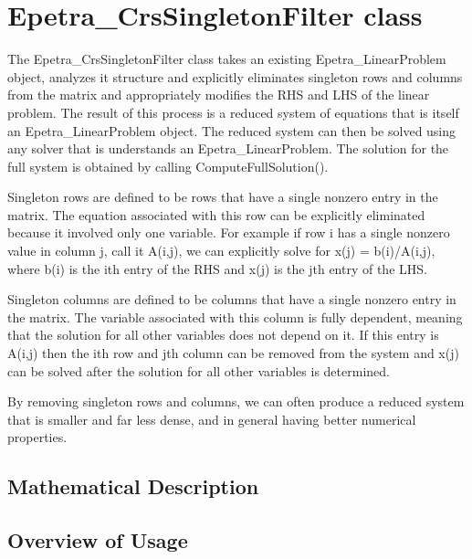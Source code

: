 \section{Epetra\_CrsSingletonFilter class}
 The Epetra\_CrsSingletonFilter class takes an existing Epetra\_LinearProblem object,
analyzes it structure and explicitly eliminates singleton rows and columns from the matrix and
appropriately modifies the RHS and LHS of the linear problem.  The result of this process is a
reduced system of equations that is itself an Epetra\_LinearProblem object.  The reduced system
can then be solved using any solver that is understands an Epetra\_LinearProblem.  The 
solution for the full system is obtained by calling ComputeFullSolution().
    
Singleton rows are defined to be rows that have a single nonzero entry in the matrix.
The equation associated with this row can be explicitly eliminated because it involved
 only one variable.  For example if row i has a single nonzero value in column j, call 
it A(i,j), we can explicitly solve for x(j) = b(i)/A(i,j), where b(i) is the ith entry 
of the RHS and x(j) is the jth entry of the LHS.

Singleton columns are defined to be columns that have a single nonzero entry in the matrix.  The variable associated with this column is fully dependent, meaning that the solution for all other variables does not depend on it.  If this entry is A(i,j) then the ith row and jth column can be removed from the system and x(j) can be solved after the solution for all other variables is determined.

By removing singleton rows and columns, we can often produce a reduced system that is smaller and far less dense, and in general having better numerical properties.

\subsection{Mathematical Description}
\subsection{Overview of Usage}

